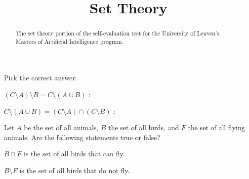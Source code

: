 \documentclass{ximera}
\title{Set Theory}
\begin{document}
\begin{abstract}
The set theory portion of the self-evaluation test for the
University of Leuven's Masters of Artificial Intelligence program.
\end{abstract}
\maketitle

Pick the correct answer:
\begin{question}
$(C \setminus A) \setminus B = C \setminus (A \cup B)$ :
\begin{solution}
\begin{multiple-choice}
\end{multiple-choice}
\end{solution}
\end{question}

\begin{question}
$C \setminus (A \cup B) = (C \setminus A) \cap (C\setminus B)$ :
\begin{solution}
\begin{multiple-choice}
\end{multiple-choice}
\end{solution}
\end{question}


Let $A$ be the set of all animals, $B$ the set of all birds, and $F$
the set of all flying animals. Are the following statements true or false?

\begin{question}
$B\cap F$ is the set of all birds that can fly.
\begin{solution}
\begin{multiple-choice}
\end{multiple-choice}
\end{solution}
\end{question}

\begin{question}
$B\setminus F$ is the set of all birds that do not fly.
\begin{solution}
\begin{multiple-choice}
\end{multiple-choice}
\end{solution}
\end{question}
\end{document}
